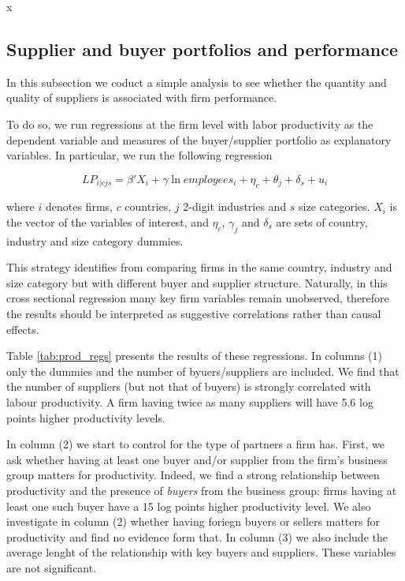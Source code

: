 x\documentclass[final, dvipsnames, authoryear,12pt]{elsarticle}
\begin{document}
\subsection{Supplier and buyer portfolios and performance}

In this subsection we coduct a simple analysis to see whether the quantity and quality of suppliers is associated with firm performance. 

To do so, we run regressions at the firm level with labor productivity as the dependent variable and measures of the buyer/supplier portfolio as explanatory variables. In particular, we run the following regression

\begin{equation}
    LP_{i|cjs}=\beta' X_{i}+\gamma \ln employees_i+\eta_c+\theta_j+\delta_s+u_i
\end{equation}{}

where $i$ denotes firms, $c$ countries, $j$ 2-digit industries and $s$ size categories. $X_{i}$ is the vector of the variables of interest, and $\eta_c$, $\gamma_j$ and $\delta_s$ are sets of country, industry and size category dummies. 

This strategy identifies from comparing firms in the same country, industry and size category but with different buyer and supplier structure. Naturally, in this cross sectional regression many key firm variables remain unobserved, therefore the results should be interpreted as suggestive correlations rather than causal effects.

Table \ref{tab:prod_regs} presents the results of these regressions. In columns (1) only the dummies and the number of byuers/suppliers are included. We find that the number of suppliers (but not that of buyers) is strongly correlated with labour productivity. A firm having twice as many suppliers will have 5.6 log points higher productivity levels. 

In column (2) we start to control for the type of partners a firm has. First, we ask whether having at least one buyer and/or supplier from the firm's business group matters for productivity. Indeed, we find a strong relationship between productivity and the presence of \textit{buyers} from the business group: firms having at least one such buyer have a 15 log points higher productivity level. We also investigate in column (2) whether having foriegn buyers or sellers matters for productivity and find no evidence form that. In column (3) we also include the average lenght of the relationship with key buyers and suppliers. These variables are not significant.
\end{document}
